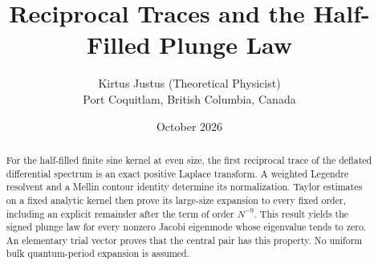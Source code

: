\documentclass[10pt]{article}
\title{Reciprocal Traces and the Half-Filled Plunge Law}
\author{Kirtus Justus (Theoretical Physicist)\\
\small Port Coquitlam, British Columbia, Canada}
\date{October 2026}
\begin{document}
\maketitle
\begin{abstract}
For the half-filled finite sine kernel at even size, the first reciprocal
trace of the deflated differential spectrum is an exact positive Laplace
transform. A weighted Legendre resolvent and a Mellin contour identity
determine its normalization. Taylor estimates on a fixed analytic kernel
then prove its large-size expansion to every fixed order, including an
explicit remainder after the term of order $N^{-9}$. This result yields
the signed plunge law for every nonzero Jacobi eigenmode whose eigenvalue
tends to zero. An elementary trial vector proves that the central pair
has this property. No uniform bulk quantum-period expansion is assumed.
\end{abstract}
\end{document}
